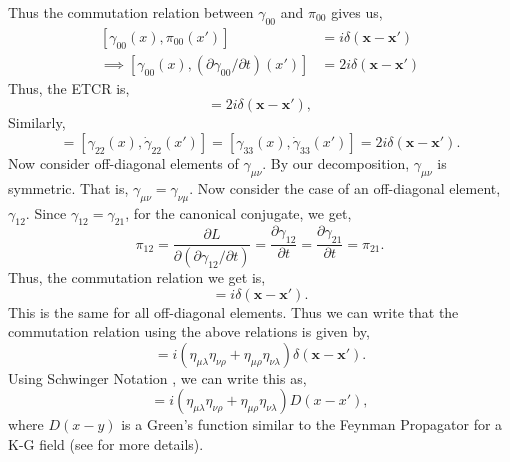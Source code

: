 \documentclass[12pt,a4paper]{report}
\theoremstyle{plain}
\theoremstyle{definition}
\theoremstyle{remark}
\newcommand{\munu}{\mu\nu}
\begin{document}
Thus the commutation relation between $\gamma_{00}$ and $\pi_{00}$ gives us,
\begin{equation}
    \begin{aligned}
        [\gamma_{00}(x), \pi_{00}(x')] &= i\delta(\bm{x} - \bm{x'}) \\
        \implies [\gamma_{00}(x), (\partial\gamma_{00}/\partial t)(x')] &= 2i\delta(\bm{x} - \bm{x'})
    \end{aligned}
\end{equation}
Thus, the ETCR is,
\begin{equation}
    [\gamma_{00}(x), \dot{\gamma}_{00}(x')] = 2i\delta(\bm{x}-\bm{x'}),
\end{equation}
Similarly,
\begin{equation}
    [\gamma_{11}(x), \dot{\gamma}_{11}(x')] = [\gamma_{22}(x), \dot{\gamma}_{22}(x')] = [\gamma_{33}(x), \dot{\gamma}_{33}(x')] = 2i\delta(\bm{x}-\bm{x'}).
\end{equation}
Now consider off-diagonal elements of $\gamma_{\munu}$. By our decomposition, $\gamma_{\munu}$ is symmetric. That is, $\gamma_{\munu} = \gamma_{\nu\mu}$. Now consider the case of an off-diagonal element, $\gamma_{12}$. Since $\gamma_{12} = \gamma_{21}$, for the canonical conjugate, we get,
\begin{equation}
    \pi_{12} = \frac{\partial L}{\partial (\partial \gamma_{12}/\partial t)} = \frac{\partial \gamma_{12}}{\partial t} = \frac{\partial \gamma_{21}}{\partial t} = \pi_{21}.
\end{equation}
Thus, the commutation relation we get is,
\begin{equation}
    [\gamma_{12}(x), \dot{\gamma}_{12}(x')] = i\delta(\bm{x}-\bm{x'}).
\end{equation}
This is the same for all off-diagonal elements. Thus we can write that the commutation relation using the above relations is given by,
\begin{equation}
    [\gamma_{\munu}(x), \dot{\gamma}_{\lambda\rho}(x')] = i(\eta_{\mu\lambda}\eta_{\nu\rho} + \eta_{\mu\rho}\eta_{\nu\lambda})\delta(\bm{x}-\bm{x'}).
\end{equation}
Using Schwinger Notation \cite{Gupta_1952, PhysRev.74.1439}, we can write this as,
\begin{equation}
    [\gamma_{\munu}(x), \gamma_{\lambda\rho}(x')] = i(\eta_{\mu\lambda}\eta_{\nu\rho} + \eta_{\mu\rho}\eta_{\nu\lambda})D(x-x'),
\end{equation}
where $D(x-y)$ is a Green's function similar to the Feynman Propagator for a K-G field (see \citet[§2.4, Eq. 2.59]{Peskin} for more details).
\end{document}

